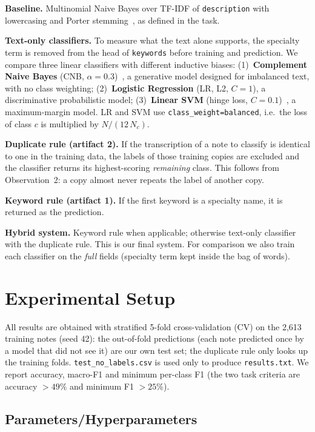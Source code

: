 \documentclass[twocolumn,10pt]{article}
\newcommand{\tfidf}{TF-IDF\xspace}
\newcommand{\cv}{CV\xspace}
\newcommand{\svm}{SVM\xspace}
\newcommand{\lr}{LR\xspace}
\newcommand{\cnb}{CNB\xspace}
\begin{document}
\textbf{Baseline.} Multinomial Naive Bayes over \tfidf of \texttt{description} with lowercasing and Porter stemming~\cite{porter1980}, as defined in the task.

\textbf{Text-only classifiers.} To measure what the text alone supports, the specialty term is removed from the head of \texttt{keywords} before training and prediction. We compare three linear classifiers with different inductive biases:
(1)~\textbf{Complement Naive Bayes} (\cnb, $\alpha=0.3$)~\cite{rennie2003cnb}, a generative model designed for imbalanced text, with no class weighting;
(2)~\textbf{Logistic Regression} (\lr, L2, $C=1$), a discriminative probabilistic model;
(3)~\textbf{Linear \svm} (hinge loss, $C=0.1$)~\cite{joachims1998svm}, a maximum-margin model.
\lr and \svm use \texttt{class\_weight=balanced}, i.e.\ the loss of class $c$ is multiplied by $N/(12\,N_c)$.

\textbf{Duplicate rule (artifact 2).} If the transcription of a note to classify is identical to one in the training data, the labels of those training copies are excluded and the classifier returns its highest-scoring \emph{remaining} class. This follows from Observation~2: a copy almost never repeats the label of another copy.

\textbf{Keyword rule (artifact 1).} If the first keyword is a specialty name, it is returned as the prediction.

\textbf{Hybrid system.} Keyword rule when applicable; otherwise text-only classifier with the duplicate rule. This is our final system. For comparison we also train each classifier on the \emph{full} fields (specialty term kept inside the bag of words).

\section{Experimental Setup}

All results are obtained with stratified 5-fold cross-validation (\cv) on the 2,613 training notes (seed 42): the out-of-fold predictions (each note predicted once by a model that did not see it) are our own test set; the duplicate rule only looks up the training folds. \texttt{test\_no\_labels.csv} is used only to produce \texttt{results.txt}. We report accuracy, macro-F1 and minimum per-class F1 (the two task criteria are accuracy $>49\%$ and minimum F1 $>25\%$).

\subsection{Parameters/Hyperparameters}
\end{document}
